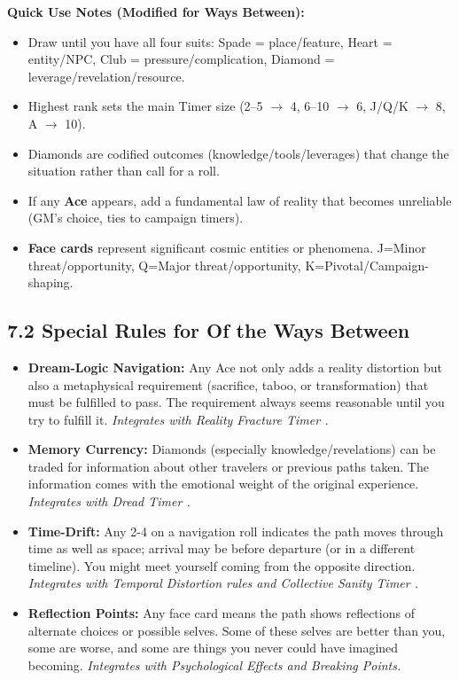 \documentclass[11pt]{article}
\begin{document}
\textbf{Quick Use Notes (Modified for Ways Between):}
\begin{itemize}
\item Draw until you have all four suits: Spade = place/feature, Heart = entity/NPC, Club = pressure/complication, Diamond = leverage/revelation/resource.
\item Highest rank sets the main Timer size (2--5 $\rightarrow$ 4, 6--10 $\rightarrow$ 6, J/Q/K $\rightarrow$ 8, A $\rightarrow$ 10).
\item Diamonds are codified outcomes (knowledge/tools/leverages) that change the situation rather than call for a roll.
\item If any \textbf{Ace} appears, add a fundamental law of reality that becomes unreliable (GM's choice, ties to campaign timers).
\item \textbf{Face cards} represent significant cosmic entities or phenomena. J=Minor threat/opportunity, Q=Major threat/opportunity, K=Pivotal/Campaign-shaping.
\end{itemize}

\clearpage

\subsection*{7.2 Special Rules for Of the Ways Between}

\begin{itemize}
\item \textbf{Dream-Logic Navigation:} Any Ace not only adds a reality distortion but also a metaphysical requirement (sacrifice, taboo, or transformation) that must be fulfilled to pass. The requirement always seems reasonable until you try to fulfill it. \textit{Integrates with Reality Fracture Timer .}
\item \textbf{Memory Currency:} Diamonds (especially knowledge/revelations) can be traded for information about other travelers or previous paths taken. The information comes with the emotional weight of the original experience. \textit{Integrates with Dread Timer .}
\item \textbf{Time-Drift:} Any 2-4 on a navigation roll indicates the path moves through time as well as space; arrival may be before departure (or in a different timeline). You might meet yourself coming from the opposite direction. \textit{Integrates with Temporal Distortion rules and Collective Sanity Timer .}
\item \textbf{Reflection Points:} Any face card means the path shows reflections of alternate choices or possible selves. Some of these selves are better than you, some are worse, and some are things you never could have imagined becoming. \textit{Integrates with Psychological Effects and Breaking Points.}
\end{itemize}
\end{document}
